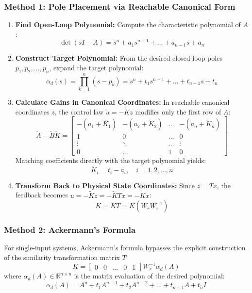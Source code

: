 \documentclass[12pt,onecolumn,twoside ]{article}
\begin{document}
	\subsubsection{Method 1: Pole Placement via Reachable Canonical Form}
	\begin{enumerate}
		\item
		\textbf{Find Open-Loop Polynomial:} Compute the characteristic polynomial of $A$: \[
		\det(sI - A) = s^n + a_1 s^{n-1} + \dots + a_{n-1}s + a_n
		\]
		\item
		\textbf{Construct Target Polynomial:} From the desired closed-loop poles ${p_1, p_2, \dots, p_n}$, expand the target polynomial: \[
		\alpha_d(s) = \prod_{k=1}^n (s - p_k) = s^n + t_1 s^{n-1} + \dots + t_{n-1}s + t_n
		\]
		\item
		\textbf{Calculate Gains in Canonical Coordinates:} In reachable canonical coordinates $z$, the control law $\tilde{u} = -\tilde{K}z$ modifies only the first row of $\tilde{A}$: \[
		\tilde{A} - \tilde{B}\tilde{K} = \begin{bmatrix} -(a_1 + \tilde{K}_1) & -(a_2 + \tilde{K}_2) & \dots & -(a_n + \tilde{K}_n) \\ 1 & 0 & \dots & 0 \\ \vdots & \ddots & \dots & \vdots \\ 0 & \dots & 1 & 0 \end{bmatrix}
		\] Matching coefficients directly with the target polynomial yields: \[
		\tilde{K}_i = t_i - a_i, \quad i = 1, 2, \dots, n
		\]
		\item
		\textbf{Transform Back to Physical State Coordinates:} Since $z = Tx$, the feedback becomes $u = -\tilde{K}z = -\tilde{K}Tx = -Kx$: \[
		K = \tilde{K}T = \tilde{K} (\tilde{W}_r W_r^{-1})
		\]
	\end{enumerate}
	
	\subsubsection{Method 2: Ackermann’s Formula}
	For single-input systems, Ackermann's formula bypasses the explicit construction of the similarity transformation matrix $T$: \[
	K = \begin{bmatrix} 0 & 0 & \dots & 0 & 1 \end{bmatrix} W_r^{-1} \alpha_d(A)
	\] where $\alpha_d(A) \in \mathbb{R}^{n \times n}$ is the matrix evaluation of the desired polynomial: \[
	\alpha_d(A) = A^n + t_1 A^{n-1} + t_2 A^{n-2} + \dots + t_{n-1} A + t_n I
	\]
\end{document}
